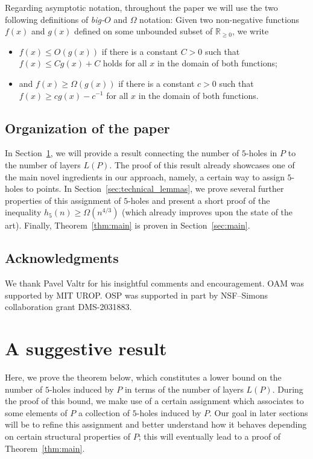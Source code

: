 \documentclass[12pt,reqno, a4paper]{amsart}
\begin{document}
Regarding asymptotic notation, throughout the paper we will use the two following definitions of \textit{big-}$O$ and $\Omega$ notation: Given two non-negative functions $f(x)$ and $g(x)$ defined on some unbounded subset of $\mathbb R_{\geq 0}$, we write
\begin{itemize}
    \item $f(x)\leq O(g(x))$ if there is a constant $C>0$ such that $f(x)\leq Cg(x)+C$ holds for all $x$ in the domain of both functions;
    \item and $f(x)\geq\Omega(g(x))$ if there is a constant $c>0$ such that $f(x)\geq cg(x)-c^{-1}$ for all $x$ in the domain of both functions.
\end{itemize}

\subsection*{Organization of the paper}
In Section~\ref{sec:layers}, we will provide a result connecting the number of $5$-holes in $P$ to the number of layers $L(P)$. The proof of this result already showcases one of the main novel ingredients in our approach, namely, a certain way to assign $5$-holes to points. In Section~\ref{sec:technical_lemmas}, we prove several further properties of this assignment of $5$-holes and present a short proof of the inequality $h_5(n)\geq\Omega(n^{4/3})$ (which already improves upon the state of the art). Finally, Theorem~\ref{thm:main} is proven in Section~\ref{sec:main}.


\subsection*{Acknowledgments} 
We thank Pavel Valtr for his insightful comments and encouragement. OAM was supported by MIT UROP. OSP was supported in part by NSF--Simons collaboration grant DMS-2031883.




\section{A suggestive result}\label{sec:layers}

Here, we prove the theorem below, which constitutes a lower bound on the number of $5$-holes induced by $P$ in terms of the number of layers $L(P)$. During the proof of this bound, we make use of a certain assignment which associates to some elements of $P$ a collection of $5$-holes induced by $P$. Our goal in later sections will be to refine this assignment and better understand how it behaves depending on certain structural properties of $P$; this will eventually lead to a proof of Theorem~\ref{thm:main}.
\end{document}
